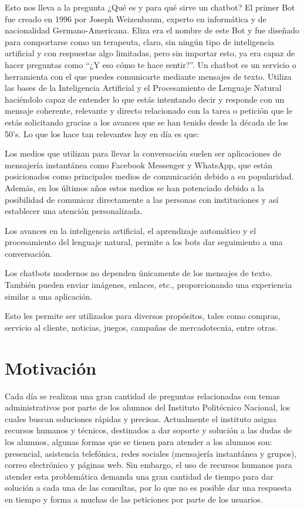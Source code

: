     Esto nos lleva a la pregunta ¿Qué es y para qué sirve un chatbot?
    El primer Bot fue creado en 1996 por Joseph Weizenbaum, experto en informática y de nacionalidad Germano-Americana. Eliza era el nombre de este Bot y fue diseñado para comportarse como un terapeuta, claro, sin ningún tipo de inteligencia artificial y con respuestas algo limitadas, pero sin importar esto, ya era capaz de hacer preguntas como “¿Y eso cómo te hace sentir?”. Un chatbot es un servicio o herramienta con el que puedes comunicarte mediante mensajes de texto. Utiliza las bases de la Inteligencia Artificial y el Procesamiento de Lenguaje Natural haciéndolo capaz de entender lo que estás intentando decir y responde con un mensaje coherente, relevante y directo relacionado con la tarea o petición que le estás solicitando gracias a los avances que se han tenido desde la década de los 50’s.  Lo que los hace tan relevantes hoy en día es que: 
    
    Los medios que utilizan para llevar la conversación suelen ser aplicaciones de mensajería instantánea como Facebook Messenger y WhatsApp, que están posicionados como principales medios de comunicación debido a su popularidad. Además, en los últimos años estos medios se han potenciado debido a la posibilidad de comunicar directamente a las personas con instituciones y así establecer una atención personalizada.
    
    Los avances en la inteligencia artificial, el aprendizaje automático y el procesamiento del lenguaje natural,  permite a los bots dar seguimiento a una conversación.
    
    Los chatbots modernos no dependen únicamente de los mensajes de texto. También pueden enviar imágenes, enlaces, etc., proporcionando una experiencia similar a una aplicación.
    
    Esto les permite ser utilizados para diversos propósitos, tales como compras, servicio al cliente, noticias, juegos, campañas de mercadotecnia, entre otras.

\section{Motivación}
    Cada día se realizan una gran cantidad de preguntas relacionadas con temas administrativos por parte de los alumnos del Instituto Politécnico Nacional, los cuales buscan soluciones rápidas y precisas. Actualmente el instituto asigna recursos humanos y técnicos, destinados a dar soporte y solución a las dudas de los alumnos, algunas formas que se tienen para atender a los alumnos son: presencial, asistencia telefónica, redes sociales (mensajería instantánea y grupos), correo electrónico y páginas web. Sin embargo, el uso de recursos humanos para atender esta problemática demanda una gran cantidad de tiempo para dar solución a cada una de las consultas, por lo que no es posible dar una respuesta en tiempo y forma a muchas de las peticiones por parte de los usuarios.
    
